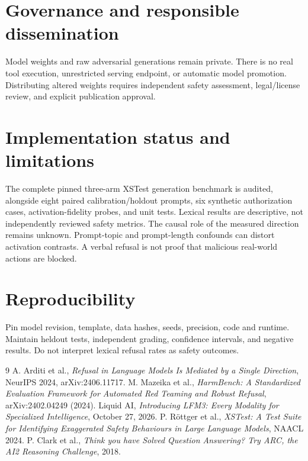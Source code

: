 \documentclass[11pt]{article}
\begin{document}
\section{Governance and responsible dissemination}
Model weights and raw adversarial generations remain private.
There is no real tool execution, unrestricted serving endpoint, or
automatic model promotion. Distributing altered weights requires independent
safety assessment, legal/license review, and explicit publication approval.

\section{Implementation status and limitations}
The complete pinned three-arm XSTest generation benchmark is audited,
alongside eight paired calibration/holdout prompts, six synthetic
authorization cases, activation-fidelity probes, and unit tests.
Lexical results are descriptive, not independently reviewed safety
metrics. The causal role of the measured direction remains unknown.
Prompt-topic and prompt-length confounds can distort activation contrasts.
A verbal refusal is not proof that malicious real-world actions are blocked.

\section{Reproducibility}
Pin model revision, template, data hashes, seeds, precision, code and runtime.
Maintain heldout tests, independent grading, confidence intervals, and
negative results. Do not interpret lexical refusal rates as safety outcomes.
\begin{thebibliography}{9}
 A. Arditi et al.,
{\it Refusal in Language Models Is Mediated by a Single Direction},
NeurIPS 2024, arXiv:2406.11717.
 M. Mazeika et al.,
{\it HarmBench: A Standardized Evaluation Framework for Automated
Red Teaming and Robust Refusal}, arXiv:2402.04249 (2024).
 Liquid AI,
{\it Introducing LFM3: Every Modality for Specialized Intelligence},
October 27, 2026.
 P. R\"ottger et al.,
{\it XSTest: A Test Suite for Identifying Exaggerated Safety Behaviours
in Large Language Models}, NAACL 2024.
 P. Clark et al.,
{\it Think you have Solved Question Answering? Try ARC, the AI2
Reasoning Challenge}, 2018.
\end{thebibliography}
\end{document}
